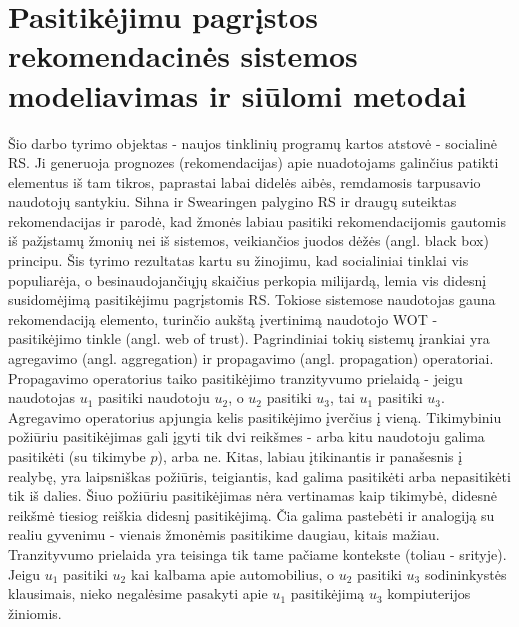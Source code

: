 \documentclass{VUMIFInfMagistrinis}
\begin{document}
\section{Pasitikėjimu pagrįstos rekomendacinės sistemos modeliavimas ir siūlomi metodai}
\indent
Šio darbo tyrimo objektas - naujos tinklinių programų kartos atstovė - socialinė RS. Ji generuoja prognozes (rekomendacijas) apie nuadotojams galinčius patikti elementus iš tam tikros, paprastai labai didelės aibės, remdamosis tarpusavio naudotojų santykiu. Sihna ir Swearingen \cite{19} palygino RS ir draugų suteiktas rekomendacijas ir parodė, kad žmonės labiau pasitiki rekomendacijomis gautomis iš pažįstamų žmonių nei iš sistemos, veikiančios juodos dėžės (angl. black box) principu. Šis tyrimo rezultatas kartu su žinojimu, kad socialiniai tinklai vis populiarėja, o besinaudojančiųjų skaičius perkopia milijardą, lemia vis didesnį susidomėjimą pasitikėjimu pagrįstomis RS.
\newline
\indent 
Tokiose sistemose naudotojas gauna rekomendaciją elemento, turinčio aukštą įvertinimą naudotojo WOT - pasitikėjimo tinkle (angl. web of trust). Pagrindiniai tokių sistemų įrankiai yra agregavimo (angl. aggregation) ir propagavimo (angl. propagation) operatoriai. Propagavimo operatorius taiko pasitikėjimo tranzityvumo prielaidą - jeigu naudotojas $u_1$ pasitiki naudotoju $u_2$, o $u_2$ pasitiki $u_3$, tai $u_1$ pasitiki $u_3$. Agregavimo operatorius apjungia kelis pasitikėjimo įverčius į vieną.
\newline
\indent
Tikimybiniu požiūriu pasitikėjimas gali įgyti tik dvi reikšmes - arba kitu naudotoju galima pasitikėti (su tikimybe $p$), arba ne. Kitas, labiau įtikinantis ir panašesnis į realybę, yra laipsniškas požiūris, teigiantis, kad galima pasitikėti arba nepasitikėti tik iš dalies. Šiuo požiūriu pasitikėjimas nėra vertinamas kaip tikimybė, didesnė reikšmė tiesiog reiškia didesnį pasitikėjimą. Čia galima pastebėti ir analogiją su realiu gyvenimu - vienais žmonėmis pasitikime daugiau, kitais mažiau.
\newline
\indent
Tranzityvumo prielaida yra teisinga tik tame pačiame kontekste (toliau - srityje). Jeigu $u_1$ pasitiki $u_2$ kai kalbama apie automobilius, o $u_2$ pasitiki $u_3$ sodininkystės klausimais, nieko negalėsime pasakyti apie $u_1$ pasitikėjimą $u_3$ kompiuterijos žiniomis. 
\newline
\indent
\end{document}
